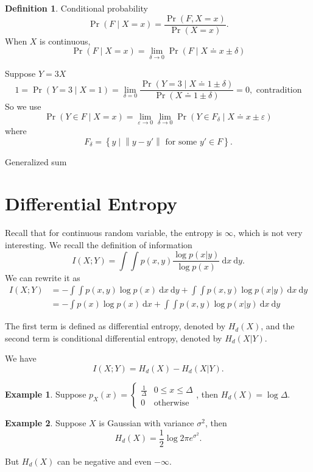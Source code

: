 \documentclass{report}
\newcommand{\idf}{\ \mathrm{d}}
\newcommand{\set}[1]{\left\lbrace #1 \right\rbrace}
\newcommand{\norm}[1]{\left\| #1 \right\|}
\theoremstyle{definition}
\newtheorem{definition}{Definition}[section]
\newtheorem{example}{Example}[section]
\theoremstyle{remark}
\numberwithin{equation}{section}
\begin{document}
\begin{definition}
  Conditional probability \[\Pr(F \mid X = x) = \frac{\Pr(F, X = x)}{\Pr(X = x)}.\]
  When $X$ is continuous, \[\Pr(F \mid X = x) = \lim_{\delta \to 0} \Pr(F \mid X \doteq x \pm \delta)\]
\end{definition}

Suppose $Y = 3X$ \[
  1 = \Pr(Y = 3 \mid X = 1) = \lim_{\delta = 0} \frac{\Pr(Y = 3 \mid X \doteq 1 \pm \delta)}{\Pr(X \doteq 1 \pm \delta)} = 0, \text{ contradition}
\]
So we use \[
  \Pr(Y \in F \mid X = x) = \lim_{\varepsilon \to 0} \lim_{\delta \to 0} \Pr(Y \in F_\delta \mid X \doteq x \pm \varepsilon) 
\] where \[
  F_\delta = \set{y \mid \norm{y - y'} \text{ for some } y' \in F}.
\]

Generalized sum 

\section{Differential Entropy}
Recall that for continuous random variable, the entropy is $\infty$, which is not very interesting. We recall the definition of information \[I(X;Y) = \int\int p(x, y)\frac{\log p(x|y)}{\log p(x)} \idf x \idf y.\]
We can rewrite it as \begin{align*}
  I(X;Y) & = -\int\int p(x, y){\log p(x)} \idf x \idf y + \int\int p(x, y)\log p(x|y) \idf x \idf y \\
  & = -\int p(x){\log p(x)} \idf x + \int\int p(x, y)\log p(x|y) \idf x \idf y
\end{align*}
  
The first term is defined as differential entropy, denoted by $H_d(X)$, and the second term is conditional differential entropy, denoted by $H_d(X|Y)$.

We have \[I(X; Y) = H_d(X) - H_d(X|Y).\]

\begin{example}
  Suppose $p_X(x) = \begin{cases}
    \frac{1}{\Delta} & 0 \leq x \leq \Delta \\
    0 & \text{otherwise}  
  \end{cases}$, then $H_d(X) = \log \Delta$.
\end{example}

\begin{example}
  Suppose $X$ is Gaussian with variance $\sigma^2$, then \[H_d(X) = \frac{1}{2}\log 2\pi e^{\sigma^2}.\]
\end{example}

But $H_d(X)$ can be negative and even $-\infty$.
\end{document}
